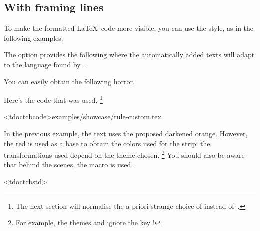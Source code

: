 \documentclass{tutodoc}
\begin{document}
\subsection{With framing lines}

To make the formatted \LaTeX\ code more visible, you can use the  style, as in the following examples.


\begin{tdocexa}
	The  option provides the following where the automatically added texts will adapt to the language found by \thisproj.

	
\end{tdocexa}


\begin{tdocexa}
	You can easily obtain the following horror.

	
	
	Here's the code that was used.%
	\footnote{
		The next section will normalise the a priori strange choice of  instead of \,.
	}

	\tdoclatexinput<tdoctcb{code}>{examples/showcase/rule-custom.tex}
\end{tdocexa}


\begin{tdocnote}
    In the previous example, the text uses the proposed darkened orange. However, the red is used as a base to obtain the colors used for the strip: the transformations used depend on the theme chosen.%
    \footnote{
        For example, the themes  and  ignore the key !
    }
    You should also be aware that behind the scenes, the macro  is used.

    \begin{tdoclatex}<tdoctcb{std}>
    \end{tdoclatex}
\end{tdocnote}
\end{document}
